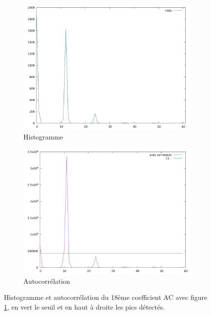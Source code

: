 \documentclass[utf8,final]{stageM2R} %
\begin{document}
\begin{figure}
  \begin{subfigure}{.5\textwidth}
    \centering
    \includegraphics[width=\linewidth]{images/histos/histo18}
    \caption{Histogramme}
  \end{subfigure}
  \begin{subfigure}{.5\textwidth}
    \centering
    \includegraphics[width=\linewidth]{images/histos/autocorrelation18}
    \caption{Autocorrélation}
    \label{fig:histo18_auto}
  \end{subfigure}
  \caption{Histogramme et autocorrélation du 18ème coefficient AC avec figure \ref{fig:histo18_auto}, en vert le seuil et en haut à droite les pics détectés.}
  \label{fig:histo18}
\end{figure}
\end{document}
